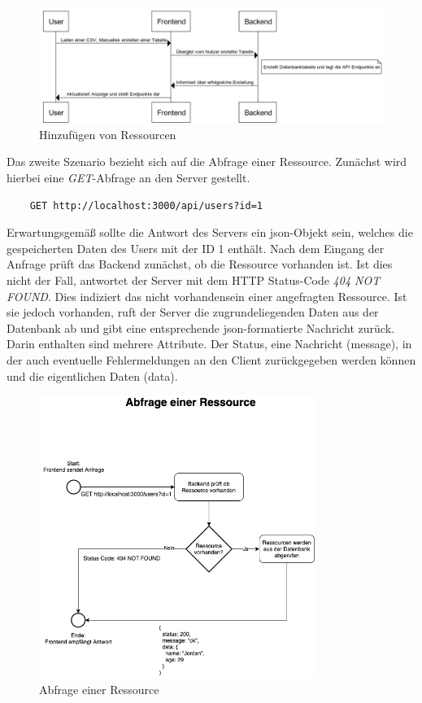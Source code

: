 \begin{figure}[h]
    \centering
    \includegraphics[width=1\textwidth]{figures/seq-hinzufuegen-von-ressourcen.png}
    \caption{Hinzufügen von Ressourcen}
    \label{fig:add-ressources}
\end{figure}

Das zweite Szenario bezieht sich auf die Abfrage einer Ressource. Zunächst wird hierbei eine \textit{GET}-Abfrage an den Server gestellt.

\begin{verbatim}
    GET http://localhost:3000/api/users?id=1
\end{verbatim}

Erwartungsgemäß sollte die Antwort des Servers ein \gls{json}-Objekt sein, welches die gespeicherten Daten des Users mit der ID 1 enthält. Nach dem Eingang der Anfrage prüft das Backend zunächst, ob die Ressource vorhanden ist. Ist dies nicht der Fall, antwortet der Server mit dem HTTP Status-Code \textit{404 NOT FOUND}. Dies indiziert das nicht vorhandensein einer angefragten Ressource. Ist sie jedoch vorhanden, ruft der Server die zugrundeliegenden Daten aus der Datenbank ab und gibt eine entsprechende \gls{json}-formatierte Nachricht zurück. Darin enthalten sind mehrere Attribute. Der Status, eine Nachricht (message), in der auch eventuelle Fehlermeldungen an den Client zurückgegeben werden können und die eigentlichen Daten (data).

\begin{figure}[h]
    \centering
    \includegraphics[width=0.8\textwidth]{figures/fc-abfrage-ressource.png}
    \caption{Abfrage einer Ressource}
    \label{fig:request-ressource}
\end{figure}
 
